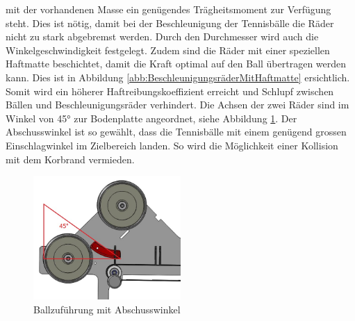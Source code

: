     mit der vorhandenen Masse ein genügendes Trägheitsmoment zur Verfügung steht. Dies ist nötig, 
    damit bei der Beschleunigung der Tennisbälle die Räder nicht zu stark abgebremst werden. Durch 
    den Durchmesser wird auch die Winkelgeschwindigkeit festgelegt. Zudem sind die Räder mit einer 
    speziellen Haftmatte beschichtet, damit die 
    Kraft optimal auf den Ball übertragen werden kann. Dies ist in Abbildung \ref{abb:BeschleunigungsräderMitHaftmatte} ersichtlich. Somit wird ein höherer Haftreibungskoeffizient 
    erreicht und Schlupf zwischen Bällen und Beschleunigungsräder verhindert. Die Achsen der zwei Räder sind im 
    Winkel von 45\si{\degree} zur Bodenplatte angeordnet, siehe Abbildung \ref{abb:Abschusswinkel}. 
    Der Abschusswinkel ist so gewählt, dass 
    die Tennisbälle mit einem genügend grossen Einschlagwinkel im Zielbereich landen. So wird die 
    Möglichkeit einer Kollision mit dem Korbrand vermieden.
    \begin{figure}[h!]
       	\includegraphics[width=0.5\textwidth,clip,trim=20mm 5mm 0mm 5mm]
       	{Enddokumentation/Bilder/Abschuss.JPG}
       	\centering
       	\caption{Ballzuführung mit Abschusswinkel}
       	\label{abb:Abschusswinkel}
    \end{figure}
